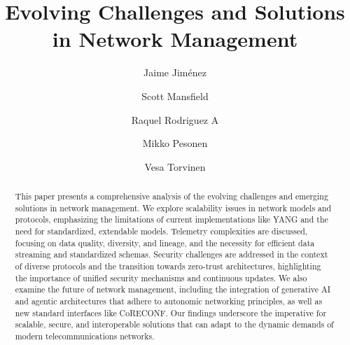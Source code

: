 \documentclass[11pt,sigconf]{iabart}
\begin{document}
\title{Evolving Challenges and Solutions in Network Management}

\author{Jaime Jiménez}

\author{Scott Mansfield}

\author{Raquel Rodriguez A}

\author{Mikko Pesonen}

\author{Vesa Torvinen}


\begin{abstract}

This paper presents a comprehensive analysis of the evolving challenges and emerging solutions in network management. We explore scalability issues in network models and protocols, emphasizing the limitations of current implementations like YANG and the need for standardized, extendable models. Telemetry complexities are discussed, focusing on data quality, diversity, and lineage, and the necessity for efficient data streaming and standardized schemas. Security challenges are addressed in the context of diverse protocols and the transition towards zero-trust architectures, highlighting the importance of unified security mechanisms and continuous updates. We also examine the future of network management, including the integration of generative AI and agentic architectures that adhere to autonomic networking principles, as well as new standard interfaces like CoRECONF. Our findings underscore the imperative for scalable, secure, and interoperable solutions that can adapt to the dynamic demands of modern telecommunications networks.

\end{abstract}


\maketitle
\end{document}
